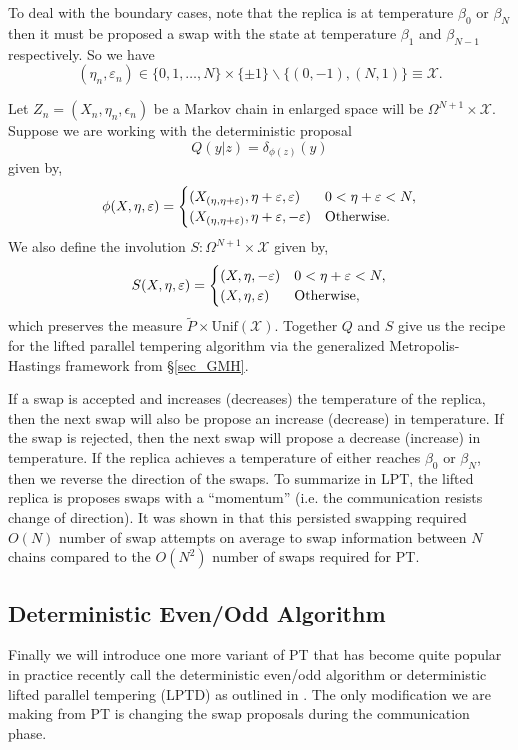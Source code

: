 To deal with the boundary cases, note that the replica is at temperature $\beta_0$ or $\beta_N$ then it must be proposed a swap with the state at temperature $\beta_1$ and $\beta_{N-1}$ respectively. So we have
\[(\eta_n,\varepsilon_n)\in \{0,1,\dots,N\}\times\{\pm 1\}\backslash\{(0,-1),(N,1)\}\equiv \mathcal{X}. \]

Let $Z_n=(X_n,\eta_n,\epsilon_n)$ be a Markov chain in enlarged space will be $\Omega^{N+1}\times\mathcal{X}$. Suppose we are working with the deterministic proposal
\[Q(y|z)=\delta_{\phi(z)}(y)\]
given by, 
\begin{align*}
\phi(X,\eta,\varepsilon)=
\begin{cases}
(X_{(\eta,\eta+\varepsilon)},\eta+\varepsilon,\varepsilon) &   0<\eta+\varepsilon<N,\\
(X_{(\eta,\eta+\varepsilon)},\eta+\varepsilon,-\varepsilon) &  \mathrm{Otherwise}.\\
\end{cases}
\end{align*}
We also define the involution $S:\Omega^{N+1}\times\mathcal{X}$ given by,
\begin{align*}
S(X,\eta,\varepsilon)=
\begin{cases}
(X,\eta,-\varepsilon) &   0<\eta+\varepsilon<N,\\
(X,\eta,\varepsilon) &  \mathrm{Otherwise},
\end{cases}
\end{align*}
which preserves the measure $\tilde{P}\times\mathrm{Unif}(\mathcal{X})$. Together $Q$ and $S$ give us the recipe for the lifted parallel tempering algorithm via the generalized Metropolis-Hastings framework from \S\ref{sec_GMH}.

If a swap is accepted and increases (decreases) the temperature of the replica, then the next swap will also be propose an increase (decrease) in temperature. If the swap is rejected, then the next swap will propose a decrease (increase) in temperature. If the replica achieves a temperature of either reaches $\beta_0$ or $\beta_N$, then we reverse the direction of the swaps. To summarize in LPT, the lifted replica is proposes swaps with a ``momentum'' (i.e. the communication resists change of direction). It was shown in \cite{diaconis2000analysis} that this persisted swapping required $O(N)$ number of swap attempts on average to swap information between $N$ chains compared to the $O(N^2)$ number of swaps required for PT.

\subsection{Deterministic Even/Odd Algorithm}
Finally we will introduce one more variant of PT that has become quite popular in practice recently call the deterministic even/odd algorithm or deterministic lifted parallel tempering (LPTD) as outlined in \cite{lingenheil2009efficiency}. The only modification we are making from PT is changing the swap proposals during the communication phase. 

